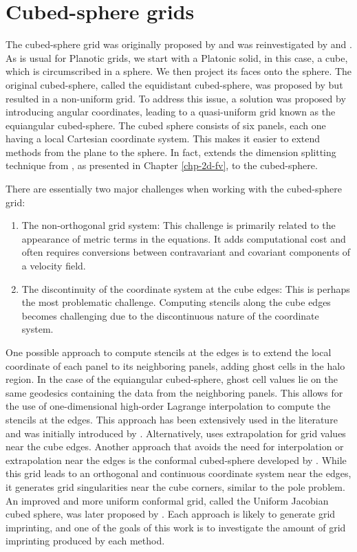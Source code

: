 \chapter{Cubed-sphere grids}
\label{chp-cs-grids}

The cubed-sphere grid was originally proposed by \citet{sadourny:1972} and was 
reinvestigated by \citet{ronchi:1996} and \citet{rancic:1996}. 
As is usual for Planotic grids, we start with a Platonic solid, in this case, a cube, 
which is circumscribed in a sphere. We then project its faces onto the sphere.
The original cubed-sphere, called the equidistant cubed-sphere, was proposed by 
\citet{sadourny:1972} but resulted in a non-uniform grid. 
To address this issue, a solution was proposed by introducing angular coordinates, 
leading to a quasi-uniform grid known as the equiangular cubed-sphere.
The cubed sphere consists of six panels, each one having a local Cartesian coordinate 
system. 
This makes it easier to extend methods from the plane to the sphere. 
In fact, \citet{putman:2007} extends the dimension splitting technique from 
\citet{lin:1996}, as presented in Chapter \ref{chp-2d-fv}, to the cubed-sphere.

There are essentially two major challenges when working with the cubed-sphere grid:
\begin{enumerate}
\item
The non-orthogonal grid system: This challenge is primarily related to the appearance of
metric terms in the equations. It adds computational cost and often requires conversions
between contravariant and covariant components of a velocity field.
\item
The discontinuity of the coordinate system at the cube edges: This is perhaps the most 
problematic challenge. Computing stencils along the cube edges becomes challenging due to 
the discontinuous nature of the coordinate system.
\end{enumerate}
One possible approach to compute stencils at the edges is to extend the local coordinate 
of each panel to its neighboring panels, adding ghost cells in the halo region. In the 
case of the equiangular cubed-sphere, ghost cell values lie on the same geodesics 
containing the data from the neighboring panels. This allows for the use of one-dimensional
high-order Lagrange interpolation to compute the stencils at the edges. 
This approach has been extensively used in the literature \citep{croisille:2013, 
katta:2015, katta:2015b, chen:2021} and was initially introduced by \citet{ronchi:1996}.
Alternatively, \citet{putman:2007} uses extrapolation for grid values near the cube edges.
Another approach that avoids the need for interpolation or extrapolation near the edges is 
the conformal cubed-sphere developed by \citet{rancic:1996}. While this grid leads to an 
orthogonal and continuous coordinate system near the edges, it generates grid singularities
near the cube corners, similar to the pole problem. 
An improved and more uniform conformal grid, called the Uniform Jacobian cubed sphere, was 
later proposed by \citet{rancic:2017}.
Each approach is likely to generate grid imprinting, and one of the goals of this work is 
to investigate the amount of grid imprinting produced by each method.

